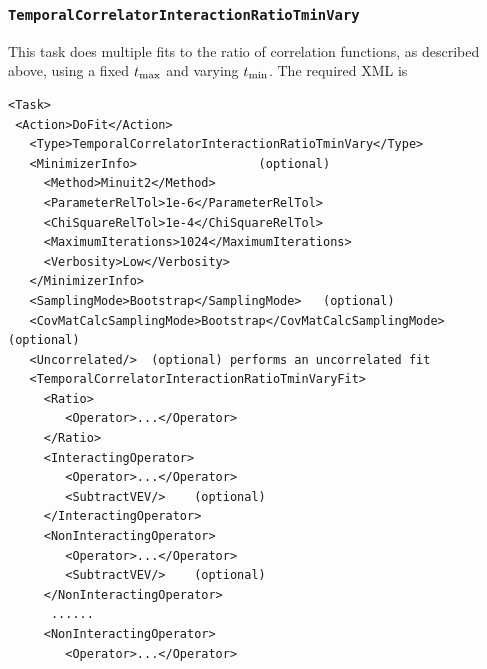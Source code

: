 \documentclass[12pt]{article}
\newcommand{\vb}{\texttt}
\begin{document}
\subsubsection{\vb{TemporalCorrelatorInteractionRatioTminVary}}                                            

This task does multiple fits to the ratio of correlation functions,
as described above, using a fixed 
$t_{\rm max}$ and varying $t_{\rm min}$.  The required XML is
\begin{verbatim}                                                                      
<Task>                                                                   
 <Action>DoFit</Action>                                                  
   <Type>TemporalCorrelatorInteractionRatioTminVary</Type>               
   <MinimizerInfo>                 (optional)                            
     <Method>Minuit2</Method>                                            
     <ParameterRelTol>1e-6</ParameterRelTol>                             
     <ChiSquareRelTol>1e-4</ChiSquareRelTol>                             
     <MaximumIterations>1024</MaximumIterations>                         
     <Verbosity>Low</Verbosity>                                          
   </MinimizerInfo>                                                      
   <SamplingMode>Bootstrap</SamplingMode>   (optional)                   
   <CovMatCalcSamplingMode>Bootstrap</CovMatCalcSamplingMode> (optional) 
   <Uncorrelated/>  (optional) performs an uncorrelated fit              
   <TemporalCorrelatorInteractionRatioTminVaryFit>                       
     <Ratio>                                                             
        <Operator>...</Operator>                                         
     </Ratio>                                                            
     <InteractingOperator>                                               
        <Operator>...</Operator>                                         
        <SubtractVEV/>    (optional)                                    
     </InteractingOperator>                                              
     <NonInteractingOperator>                                            
        <Operator>...</Operator>                                         
        <SubtractVEV/>    (optional)                                    
     </NonInteractingOperator>                                           
      ......                                                             
     <NonInteractingOperator>                                            
        <Operator>...</Operator>                                         

\end{verbatim}
\end{document}
